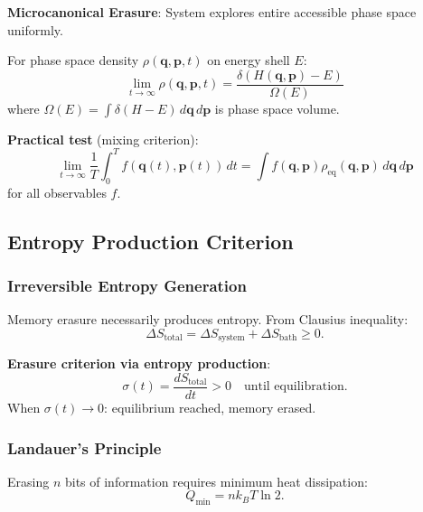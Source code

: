 \documentclass[11pt]{article}
\theoremstyle{defstyle}
\theoremstyle{mapstyle}
\begin{document}
\textbf{Microcanonical Erasure}: System explores entire accessible phase space uniformly.

For phase space density $\rho(\mathbf{q}, \mathbf{p}, t)$ on energy shell $E$:
\begin{equation}
\boxed{\lim_{t \to \infty} \rho(\mathbf{q}, \mathbf{p}, t) = \frac{\delta(H(\mathbf{q}, \mathbf{p}) - E)}{\Omega(E)}}
\end{equation}
where $\Omega(E) = \int \delta(H - E)\, d\mathbf{q}\, d\mathbf{p}$ is phase space volume.

\textbf{Practical test} (mixing criterion):
\begin{equation}
\lim_{t \to \infty} \frac{1}{T} \int_0^T f(\mathbf{q}(t), \mathbf{p}(t))\, dt
=
\int f(\mathbf{q}, \mathbf{p}) \rho_{\text{eq}}(\mathbf{q}, \mathbf{p})\, d\mathbf{q}\, d\mathbf{p}
\end{equation}
for all observables $f$.

\subsection{Entropy Production Criterion}

\subsubsection{Irreversible Entropy Generation}

Memory erasure necessarily produces entropy. From Clausius inequality:
\begin{equation}
\Delta S_{\text{total}} = \Delta S_{\text{system}} + \Delta S_{\text{bath}} \geq 0.
\end{equation}

\textbf{Erasure criterion via entropy production}:
\begin{equation}
\boxed{\sigma(t) = \frac{dS_{\text{total}}}{dt} > 0 \quad \text{until equilibration}.}
\end{equation}
When $\sigma(t) \to 0$: equilibrium reached, memory erased.

\subsubsection{Landauer's Principle}

Erasing $n$ bits of information requires minimum heat dissipation:
\begin{equation}
Q_{\text{min}} = n k_B T \ln 2.
\end{equation}
\end{document}
